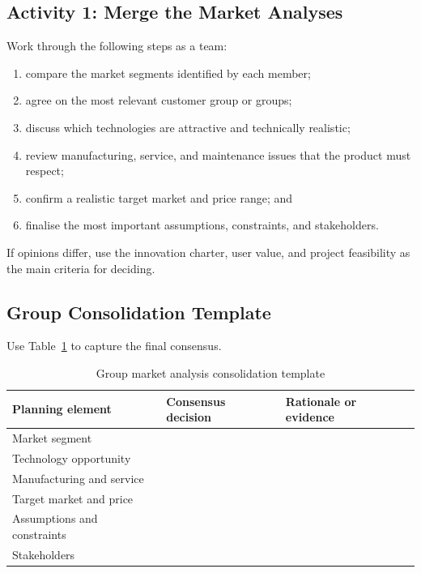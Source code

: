 \subsection{Activity 1: Merge the Market Analyses}

Work through the following steps as a team:
\begin{enumerate}
    \item compare the market segments identified by each member;
    \item agree on the most relevant customer group or groups;
    \item discuss which technologies are attractive and technically realistic;
    \item review manufacturing, service, and maintenance issues that the product must respect;
    \item confirm a realistic target market and price range; and
    \item finalise the most important assumptions, constraints, and stakeholders.
\end{enumerate}

If opinions differ, use the innovation charter, user value, and project feasibility as the main criteria for deciding.

\subsection{Group Consolidation Template}

Use Table~\ref{tab:session56-group-consolidation} to capture the final consensus.

\begin{table}[htbp]
\centering
\caption{Group market analysis consolidation template}
\label{tab:session56-group-consolidation}
\renewcommand{\arraystretch}{1.2}
\begin{tabularx}{\textwidth}{|>{\raggedright\arraybackslash}p{}|>{\raggedright\arraybackslash}X|>{\raggedright\arraybackslash}p{}|}
\hline
\textbf{Planning element} & \textbf{Consensus decision} & \textbf{Rationale or evidence} \\
\hline
Market segment &  &  \\
\hline
Technology opportunity &  &  \\
\hline
Manufacturing and service &  &  \\
\hline
Target market and price &  &  \\
\hline
Assumptions and constraints &  &  \\
\hline
Stakeholders &  &  \\
\hline
\end{tabularx}
\end{table}

